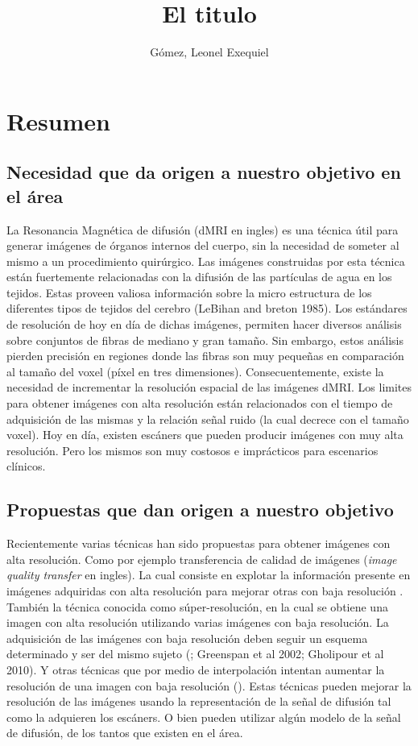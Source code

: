 \documentclass[a4paper,10pt]{article}
\title{El titulo}
\author{Gómez, Leonel Exequiel}
\begin{document}
\maketitle

\section{Resumen}

\subsection{Necesidad que da origen a nuestro objetivo en el área}
La Resonancia Magnética de difusión (dMRI en ingles) es una técnica útil para generar imágenes de 
órganos internos del 
cuerpo, sin la necesidad de someter al mismo a un procedimiento quirúrgico. Las imágenes construidas por esta técnica 
están fuertemente relacionadas con la difusión de las partículas de agua en los tejidos. Estas proveen valiosa 
información sobre la micro estructura de los diferentes tipos de tejidos del cerebro (LeBihan and 
breton 1985). Los estándares de resolución de hoy en día de dichas imágenes, permiten hacer 
diversos análisis sobre conjuntos de fibras de mediano y gran tamaño. Sin embargo, estos análisis 
pierden precisión en regiones donde las fibras son muy pequeñas en comparación 
al tamaño del voxel (píxel en tres dimensiones). Consecuentemente, existe la necesidad de 
incrementar la resolución espacial de las imágenes dMRI. Los limites para 
obtener imágenes con alta resolución están relacionados con el 
tiempo de adquisición de las mismas y la relación señal ruido (la cual decrece 
con el tamaño voxel). Hoy en día, existen escáners que pueden 
producir imágenes con muy alta resolución. Pero los mismos son muy costosos e 
imprácticos para escenarios clínicos.


\subsection{Propuestas que dan origen a nuestro objetivo}
Recientemente varias técnicas han sido propuestas para obtener imágenes con alta resolución. Como 
por ejemplo 
transferencia de calidad de imágenes (\textit{image quality transfer} en ingles). La cual 
consiste en explotar la 
información presente en imágenes adquiridas con alta resolución para mejorar otras con baja resolución 
\citep{Alexander2014}. También la técnica conocida como súper-resolución, en 
la cual se obtiene una imagen con alta resolución utilizando varias imágenes con baja resolución. 
La adquisición de las imágenes con baja 
resolución deben seguir un esquema determinado y ser del mismo sujeto (\cite{Irani1993,Robinson2010}; Greenspan et al 
2002; Gholipour et al 2010). Y otras técnicas que por medio de interpolación 
intentan aumentar la resolución de una imagen con baja resolución (\cite{Manjon2010}). Estas técnicas pueden mejorar la 
resolución de las imágenes usando la representación de la señal de difusión tal como la adquieren los escáners. O bien 
pueden utilizar algún modelo de la señal de difusión, de los tantos que existen en el área.
\end{document}
